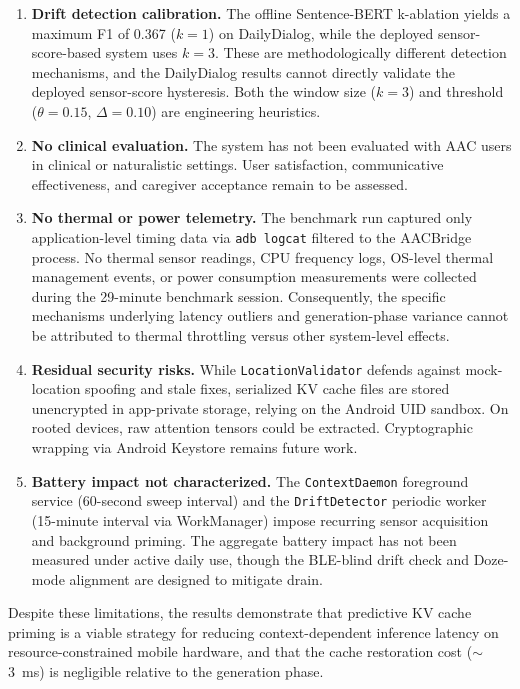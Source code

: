 \documentclass[journal]{IEEEtran}
\begin{document}
\begin{enumerate}
    \item \textbf{Drift detection calibration.} The offline Sentence-BERT k-ablation yields a maximum F1 of 0.367 ($k = 1$) on DailyDialog, while the deployed sensor-score-based system uses $k = 3$. These are methodologically different detection mechanisms, and the DailyDialog results cannot directly validate the deployed sensor-score hysteresis. Both the window size ($k = 3$) and threshold ($\theta = 0.15$, $\Delta = 0.10$) are engineering heuristics.

    \item \textbf{No clinical evaluation.} The system has not been evaluated with AAC users in clinical or naturalistic settings. User satisfaction, communicative effectiveness, and caregiver acceptance remain to be assessed.

    \item \textbf{No thermal or power telemetry.} The benchmark run captured only application-level timing data via \texttt{adb logcat} filtered to the AACBridge process. No thermal sensor readings, CPU frequency logs, OS-level thermal management events, or power consumption measurements were collected during the 29-minute benchmark session. Consequently, the specific mechanisms underlying latency outliers and generation-phase variance cannot be attributed to thermal throttling versus other system-level effects.

    \item \textbf{Residual security risks.} While \texttt{LocationValidator} defends against mock-location spoofing and stale fixes, serialized KV cache files are stored unencrypted in app-private storage, relying on the Android UID sandbox. On rooted devices, raw attention tensors could be extracted. Cryptographic wrapping via Android Keystore remains future work.

    \item \textbf{Battery impact not characterized.} The \texttt{ContextDaemon} foreground service (60-second sweep interval) and the \texttt{DriftDetector} periodic worker (15-minute interval via WorkManager) impose recurring sensor acquisition and background priming. The aggregate battery impact has not been measured under active daily use, though the BLE-blind drift check and Doze-mode alignment are designed to mitigate drain.
\end{enumerate}

Despite these limitations, the results demonstrate that predictive KV cache priming is a viable strategy for reducing context-dependent inference latency on resource-constrained mobile hardware, and that the cache restoration cost ($\sim$3~ms) is negligible relative to the generation phase.
\end{document}
